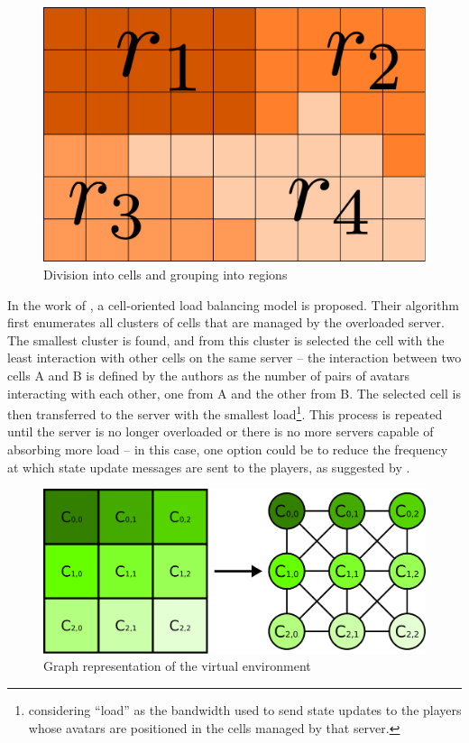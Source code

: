 \documentclass[acmjacm]{acmtrans2m}
\begin{document}
\begin{figure}[!t]
	\centering
	\includegraphics[width=0.4\linewidth]{images/macromicro}
	\caption{Division into cells and grouping into regions}
	\label{fig:cells}
\end{figure}

In the work of \cite{ahmed2008mol}, a cell-oriented load balancing model is proposed. Their algorithm first enumerates all clusters of cells that are managed by the overloaded server. The smallest cluster is found, and from this cluster is selected the cell with the least interaction with other cells on the same server -- the interaction between two cells A and B is defined by the authors as the number of pairs of avatars interacting with each other, one from A and the other from B. The selected cell is then transferred to the server
with the smallest load\footnote{considering ``load'' as the bandwidth used to send state updates to the players whose avatars are positioned in the cells managed by that server.}. This process is repeated until the server is no longer overloaded or there is no more servers capable of absorbing more load -- in this case, one option could be to reduce the frequency at which state update messages are sent to the players, as suggested by \cite{bezerra2008a3}.

\begin{figure}[!t]
	\centering
	\includegraphics[width=0.7\linewidth]{images/grafo}
	\caption{Graph representation of the virtual environment}
	\label{fig:graph}
\end{figure}
\end{document}
